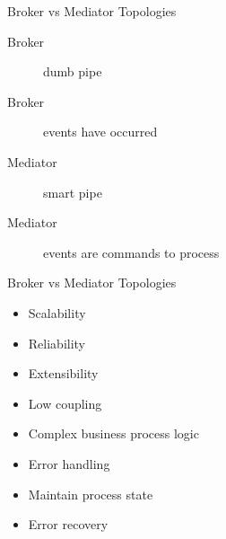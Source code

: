 \documentclass{slide}
\begin{document}
\begin{frame}{Broker vs Mediator Topologies}
    \vspace{1mm}
    {\LARGE
    \begin{description}
        \item[Broker] dumb pipe
        \vspace{3mm}
        \item[Broker] events have occurred
        \vspace{3mm}
        \item[Mediator] smart pipe
        \vspace{3mm}
        \item[Mediator] events are commands to process
    \end{description}
    }
\end{frame}

\begin{frame}{Broker vs Mediator Topologies}
    \vspace{1mm}
    {\LARGE
    \begin{itemize}
        \item Scalability
        \item Reliability
        \item Extensibility
        \item Low coupling
    \end{itemize}
    \vspace{1mm}
    \begin{itemize}
        \item Complex business process logic
        \item Error handling
        \item Maintain process state
        \item Error recovery
    \end{itemize}
    }
\end{frame}
\end{document}
